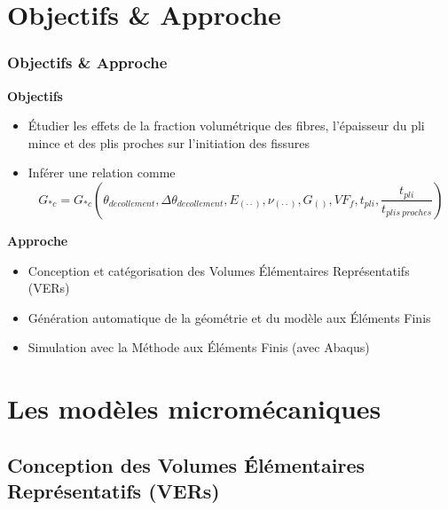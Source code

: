 \documentclass[first,firstsupp,lastsupp,handout,last,hyperref,table]{ETHclass}
\begin{document}
\section{Objectifs \& Approche}

\begin{frame}
\frametitle{Objectifs \& Approche}
\vspace{-0.25cm}
\centering
\scriptsize
\begin{alertblock}{\small \bf{Objectifs}}
\begin{itemize}
    \item \'Etudier les effets de la fraction volum\'etrique des fibres, l'\'epaisseur du pli mince et des plis proches sur l'initiation des fissures
    \item Inf\'erer une relation comme
	\begin{equation*}
		G_{*c}=G_{*c}\left(\theta_{decollement},\Delta\theta_{decollement}, E_{\left(\cdot\cdot\right)}, \nu_{\left(\cdot\cdot\right)}, G_{\left(\right)},VF_{f}, t_{pli}, \frac{t_{pli}}{t_{plis\ proches}}\right)
	\end{equation*}
\end{itemize}
\end{alertblock}
\begin{alertblock}{\small \bf{Approche}}
\begin{itemize}
    \item Conception et cat\'egorisation des Volumes \'El\'ementaires Repr\'esentatifs (VERs)
    \item G\'en\'eration automatique de la g\'eom\'etrie et du mod\`ele aux \'El\'ements Finis
    \item Simulation avec la M\'ethode aux \'El\'ements Finis (avec Abaqus)
\end{itemize}
\end{alertblock}
\end{frame}

\section[Les mod\`eles]{Les mod\`eles microm\'ecaniques}

\subsection[Conception des VERs]{Conception des Volumes \'El\'ementaires Repr\'esentatifs (VERs)}
\end{document}
